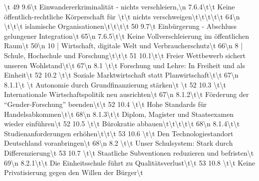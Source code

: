 \documentclass[12pt,]{book}
\makeatletter
\newenvironment{Shaded}{\begin{snugshade}}{\end{snugshade}}
\newenvironment{kframe}{%
\medskip{}
\setlength{\fboxsep}{.8em}
 \def\at@end@of@kframe{}%
 \ifinner\ifhmode%
  \def\at@end@of@kframe{\end{minipage}}%
  \begin{minipage}{\columnwidth}%
 \fi\fi%
 \def\FrameCommand##1{\hskip\@totalleftmargin \hskip-\fboxsep
 \colorbox{shadecolor}{##1}\hskip-\fboxsep
     \hskip-\linewidth \hskip-\@totalleftmargin \hskip\columnwidth}%
 \MakeFramed {\advance\hsize-\width
   \@totalleftmargin\z@ \linewidth\hsize
   \@setminipage}}%
 {\par\unskip\endMakeFramed%
 \at@end@of@kframe}
\renewenvironment{Shaded}{\begin{kframe}}{\end{kframe}}
\makeatother
\begin{document}
\begin{Shaded}
\begin{Highlighting}[]
\textbackslash{}t                  49   9.6\textbackslash{}t Einwandererkriminalität - nichts verschleiern,\textbackslash{}n     7.6.4\textbackslash{}t\textbackslash{}t Keine öffentlich-rechtliche Körperschaft für                     \textbackslash{}t\textbackslash{}t       nichts verschweigen\textbackslash{}t\textbackslash{}t\textbackslash{}t\textbackslash{}t\textbackslash{}t                               64\textbackslash{}n     \textbackslash{}t\textbackslash{}t\textbackslash{}t      islamische Organisationen\textbackslash{}t\textbackslash{}t\textbackslash{}t\textbackslash{}t                                50   9.7\textbackslash{}t Einbürgerung - Abschluss gelungener Integration\textbackslash{}t         65\textbackslash{}n     7.6.5\textbackslash{}t\textbackslash{}t Keine Vollverschleierung im öffentlichen Raum\textbackslash{}t                50\textbackslash{}n                                                                              10 | Wirtschaft, digitale Welt und Verbraucherschutz\textbackslash{}t           66\textbackslash{}n   8 | Schule, Hochschule und Forschung\textbackslash{}t\textbackslash{}t\textbackslash{}t                                 51   10.1\textbackslash{}t\textbackslash{}t Freier Wettbewerb sichert unseren Wohlstand\textbackslash{}t\textbackslash{}t          67\textbackslash{}n     8.1 \textbackslash{}t\textbackslash{}t Forschung und Lehre: In Freiheit und als Einheit\textbackslash{}t              52   10.2 \textbackslash{}t\textbackslash{}t Soziale Marktwirtschaft statt Planwirtschaft\textbackslash{}t\textbackslash{}t        67\textbackslash{}n     8.1.1\textbackslash{}t \textbackslash{}t Autonomie durch Grundfinanzierung stärken\textbackslash{}t \textbackslash{}t                 52   10.3 \textbackslash{}t\textbackslash{}t Internationale Wirtschaftspolitik neu ausrichten\textbackslash{}t     67\textbackslash{}n     8.1.2\textbackslash{}t\textbackslash{}t Förderung der “Gender-Forschung” beenden\textbackslash{}t\textbackslash{}t                    52   10.4 \textbackslash{}t\textbackslash{}t Hohe Standards für Handelsabkommen\textbackslash{}t\textbackslash{}t                  68\textbackslash{}n     8.1.3\textbackslash{}t\textbackslash{}t Diplom, Magister und Staatsexamen wieder einführen\textbackslash{}t           52   10.5 \textbackslash{}t\textbackslash{}t Bürokratie abbauen\textbackslash{}t\textbackslash{}t\textbackslash{}t\textbackslash{}t\textbackslash{}t                               68\textbackslash{}n     8.1.4\textbackslash{}t\textbackslash{}t Studienanforderungen erhöhen\textbackslash{}t\textbackslash{}t\textbackslash{}t                               53   10.6 \textbackslash{}t\textbackslash{}t Den Technologiestandort Deutschland voranbringen\textbackslash{}t     68\textbackslash{}n     8.2 \textbackslash{}t\textbackslash{}t Unser Schulsystem: Stark durch Differenzierung\textbackslash{}t                53   10.7 \textbackslash{}t\textbackslash{}t Staatliche Subventionen reduzieren und befristen\textbackslash{}t     69\textbackslash{}n     8.2.1\textbackslash{}t\textbackslash{}t Die Einheitsschule führt zu Qualitätsverlust\textbackslash{}t\textbackslash{}t                53   10.8 \textbackslash{}t\textbackslash{}t Keine Privatisierung gegen den Willen der Bürger\textbackslash{}t     
\end{Highlighting}
\end{Shaded}
\end{document}
